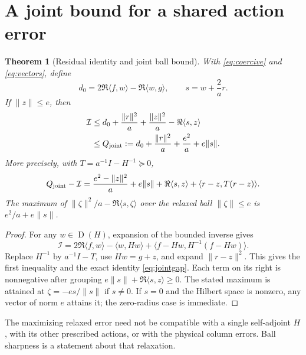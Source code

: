 \documentclass[11pt,a4paper]{article}
\newcommand{\Dom}{\operatorname{D}}
\newcommand{\ip}[2]{\langle #1,#2\rangle}
\newcommand{\norm}[1]{\lVert #1\rVert}
\newcommand{\Iresp}{\mathcal I}
\newtheorem{theorem}{Theorem}[section]
\theoremstyle{definition}
\theoremstyle{remark}
\numberwithin{equation}{section}
\begin{document}
\section{A joint bound for a shared action error}\label{sec:joint}

\begin{theorem}[Residual identity and joint ball bound]\label{thm:joint}
With \eqref{eq:coercive} and \eqref{eq:vectors}, define
\[
 d_0=2\Re\ip fw-\Re\ip wg,\qquad s=w+\frac2a r.
\]
If $\norm z\le e$, then
\begin{align}
 \Iresp
 &\le d_0+\frac{\norm r^2}{a}+\frac{\norm z^2}{a}
                  -\Re\ip sz \notag\\
 &\le Q_{\rm joint}:=d_0+\frac{\norm r^2}{a}
                         +\frac{e^2}{a}+e\norm s.       \label{eq:joint}
\end{align}
More precisely, with $T=a^{-1}I-H^{-1}\succeq0$,
\begin{equation}\label{eq:jointgap}
 Q_{\rm joint}-\Iresp
 =\frac{e^2-\norm z^2}{a}
  +e\norm s+\Re\ip sz+\ip{r-z}{T(r-z)}.
\end{equation}
The maximum of $\norm{\zeta}^2/a-\Re\ip s\zeta$ over the relaxed ball
$\norm\zeta\le e$ is $e^2/a+e\norm s$.
\end{theorem}
\begin{proof}
For any $w\in\Dom(H)$, expansion of the bounded inverse gives
\begin{equation}\label{eq:residentity}
 \Iresp=2\Re\ip fw-\ip w{Hw}
             +\ip{f-Hw}{H^{-1}(f-Hw)}.
\end{equation}
Replace $H^{-1}$ by $a^{-1}I-T$, use $Hw=g+z$, and expand
$\norm{r-z}^2$. This gives the first inequality and the exact identity
\eqref{eq:jointgap}. Each term on its right is nonnegative after
grouping $e\norm s+\Re\ip sz\ge0$. The stated maximum is attained at
$\zeta=-es/\norm s$ if $s\ne0$. If $s=0$ and the Hilbert space is
nonzero, any vector of norm $e$ attains it; the zero-radius case is
immediate.
\end{proof}

The maximizing relaxed error need not be compatible with a single
self-adjoint $H$, with its other prescribed actions, or with the physical
column errors. Ball sharpness is a statement about that relaxation.
\end{document}
